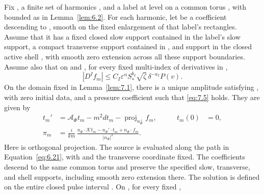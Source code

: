 \begin{proposition}\label{prop:7.2}
Fix , a finite set of harmonics , and a label at level  on a
common torus , with  bounded as in Lemma~\ref{lem:6.2}. For each harmonic, let 
be a coefficient descending to , smooth on the fixed enlargement of that label's rectangles. Assume
that it has a fixed closed slow support contained in the label's slow support, a compact transverse
support contained in , and support in the closed active shell , with smooth zero
extension across all these support boundaries. Assume also that on  and ,
for every fixed multi-index  of derivatives in ,
\[
|D^If_m|\leq C_I\varepsilon^\alpha S_*^{b_I}\sqrt{\zeta}\,\delta^{-a_I}P(v).
\]
On the domain  fixed in Lemma~\ref{lem:7.1}, there is a unique amplitude  satisfying ,
with zero initial data, and a pressure coefficient  such that \eqref{eq:7.5} holds. They are given by
\begin{equation}
\begin{aligned}
t_m'&=\mathcal A_\Phi t_m-m^2dt_m-\operatorname{proj}_{n_\Phi^\perp}f_m,
&\qquad t_m(0)&=0,\\
\pi_m&=\frac{i}{km}\,
\frac{n_\Phi\cdot\mathcal Kt_m-n_\Phi'\cdot t_m+n_\Phi\cdot f_m}{|n_\Phi|^2}.
\end{aligned}
\tag{7.13}\label{eq:7.13}
\end{equation}
Here  is orthogonal projection. The source is evaluated along the
path  in Equation~\eqref{eq:6.21}, with  and the transverse coordinate fixed. The coefficients
descend to the same common torus and preserve the specified slow, transverse, and shell supports,
including smooth zero extension there. The solution is defined on the entire closed pulse interval
. On , for every fixed ,

\end{proposition}
